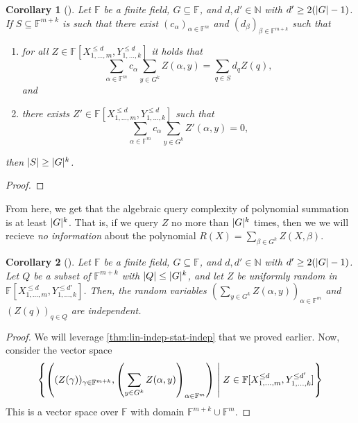 \documentclass[english,12pt]{reedthesis}
\theoremstyle{plain}
\newtheorem{cor}[cor]{Corollary}
\theoremstyle{definition}
\theoremstyle{remark}
\DeclarePairedDelimiter{\abs}{\lvert}{\rvert}
\newcommand{\middlemid}{%
  \ensuremath{\;\middle\vert\;}
}
\begin{document}
\begin{cor}[{\cite[Corollary 12.2]{CFGS22}}]
  Let $\mathbb{F}$ be a finite field, $G \subseteq \mathbb{F}$, and $d, d' \in \mathbb{N}$ with
  $d' \ge 2(\abs{G} - 1)$. If $S \subseteq \mathbb{F}^{m+k}$ is such that there exist
  $(c_{\alpha})_{\alpha \in \mathbb{F}^{m}}$ and $(d_{\beta})_{\beta \in \mathbb{F}^{m+k}}$ such that
  \begin{enumerate}
    \item for all $Z \in \mathbb{F}[X_{1, \ldots, m}^{\le d}, Y_{1, \ldots, k}^{\le d}]$ it
          holds that
          \begin{equation}
            \sum_{\alpha \in \mathbb{F}^{m}}c_{\alpha}\sum_{y \in G^{k}}Z(\alpha, y) = \sum_{q \in S}d_{q}Z(q),
          \end{equation}
          and
    \item there exists $Z' \in \mathbb{F}[X_{1, \ldots, m}^{\le d}, Y_{1, \ldots, k}^{\le d}]$
          such that
          \begin{equation}
            \sum_{\alpha \in \mathbb{F}^{m}}c_{\alpha}\sum_{y \in G^{k}}Z'(\alpha, y) = 0,
          \end{equation}
  \end{enumerate}
  then $\abs{S} \ge \abs{G}^{k}$.
\end{cor}

\begin{proof}
\end{proof}

From here, we get that the algebraic query complexity of polynomial summation is
at least $\abs{G}^{k}$. That is, if we query $Z$ no more than $\abs{G}^{k}$
times, then we we will recieve \emph{no information} about the polynomial
$R(X) = \sum_{\beta \in G^{k}}Z(X, \beta)$.

\begin{cor}[{\cite[Corollary 12.3]{CFGS22}}]
  Let $\mathbb{F}$ be a finite field, $G \subseteq \mathbb{F}$, and $d, d' \in \mathbb{N}$ with
  $d' \ge 2(\abs{G} - 1)$. Let $Q$ be a subset of $\mathbb{F}^{m+k}$ with
  $\abs{Q} \le \abs{G}^{k}$, and let $Z$ be uniformly random in
  $\mathbb{F}[X_{1, \ldots, m}^{\le d}, Y_{1, \ldots, k}^{\le d'}]$. Then, the random
  variables $(\sum_{y \in G^{k}}Z(\alpha, y))_{\alpha \in \mathbb{F}^{m}}$ and $(Z(q))_{q \in Q}$
  are independent.
\end{cor}

\begin{proof}
  We will leverage \cref{thm:lin-indep-stat-indep} that we proved earlier. Now,
  consider the vector space
  \begin{equation} %
    \mleft\{
      \mleft(
        (Z(\gamma))_{\gamma \in \mathbb{F}^{m+k}}, \mleft(\sum_{y \in G^{k}}Z(\alpha, y)\mright)_{\alpha \in \mathbb{F}^{m}}
      \mright)
      \middlemid
      Z \in \mathbb{F}[X_{1, \ldots, m}^{\le d}, Y_{1, \ldots, k}^{\le d'}]
    \mright\}
  \end{equation}
  This is a vector space over $\mathbb{F}$ with domain
  $\mathbb{F}^{m+k} \cup \mathbb{F}^{m}$. %
\end{proof}
\end{document}
